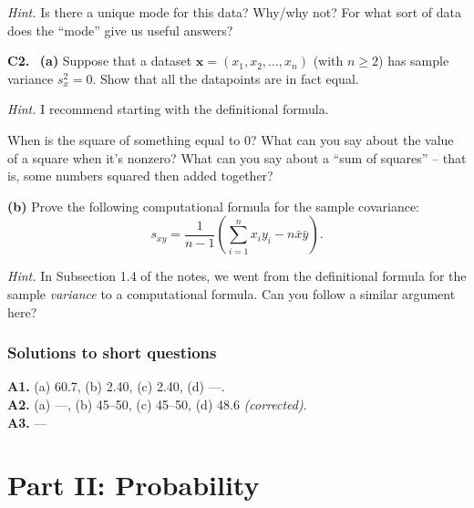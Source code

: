 \documentclass[
  a4paper,
]{book}
\theoremstyle{definition}
\theoremstyle{definition}
\theoremstyle{definition}
\theoremstyle{definition}
\theoremstyle{remark}
\begin{document}
\begin{myanswers}
\emph{Hint.}
Is there a unique mode for this data? Why/why not? For what sort of data does the ``mode'' give us useful answers?

\end{myanswers}

\textbf{C2.}
~\textbf{(a)} Suppose that a dataset \(\mathbf x = (x_1, x_2, \dots, x_n)\) (with \(n \geq 2\)) has sample variance \(s_x^2 = 0\). Show that all the datapoints are in fact equal.

\begin{myanswers}
\emph{Hint.}
I recommend starting with the definitional formula.

When is the square of something equal to 0? What can you say about the value of a square when it's nonzero? What can you say about a ``sum of squares'' -- that is, some numbers squared then added together?

\end{myanswers}

\textbf{(b)} Prove the following computational formula for the sample covariance:
\[ s_{xy} = \frac{1}{n-1} \left( \sum_{i=1}^n x_iy_i - n\bar x \bar y \right). \]

\begin{myanswers}
\emph{Hint.}
In Subsection 1.4 of the notes, we went from the definitional formula for the sample \emph{variance} to a computational formula. Can you follow a similar argument here?

\end{myanswers}

\hypertarget{P1-short-sols}{%
\section*{Solutions to short questions}\label{P1-short-sols}}

\textbf{A1.} (a) 60.7, (b) 2.40, (c) 2.40, (d) ---.\\
\textbf{A2.} (a) ---, (b) 45--50, (c) 45--50, (d) 48.6 \emph{(corrected)}.\\
\textbf{A3.} ---

\hypertarget{part-part-ii-probability}{%
\part*{Part II: Probability}\label{part-part-ii-probability}}
\end{document}
